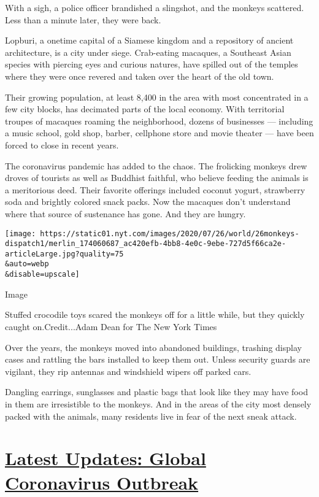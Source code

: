 With a sigh, a police officer brandished a slingshot, and the monkeys
scattered. Less than a minute later, they were back.

Lopburi, a onetime capital of a Siamese kingdom and a repository of
ancient architecture, is a city under siege. Crab-eating macaques, a
Southeast Asian species with piercing eyes and curious natures, have
spilled out of the temples where they were once revered and taken over
the heart of the old town.

Their growing population, at least 8,400 in the area with most
concentrated in a few city blocks, has decimated parts of the local
economy. With territorial troupes of macaques roaming the neighborhood,
dozens of businesses --- including a music school, gold shop, barber,
cellphone store and movie theater --- have been forced to close in
recent years.

The coronavirus pandemic has added to the chaos. The frolicking monkeys
drew droves of tourists as well as Buddhist faithful, who believe
feeding the animals is a meritorious deed. Their favorite offerings
included coconut yogurt, strawberry soda and brightly colored snack
packs. Now the macaques don't understand where that source of sustenance
has gone. And they are hungry.

\texttt{[image: https://static01.nyt.com/images/2020/07/26/world/26monkeys-dispatch1/merlin\_174060687\_ac420efb-4bb8-4e0c-9ebe-727d5f66ca2e-articleLarge.jpg?quality=75\\\&auto=webp\\\&disable=upscale]}

Image

Stuffed crocodile toys scared the monkeys off for a little while, but
they quickly caught on.Credit...Adam Dean for The New York Times

Over the years, the monkeys moved into abandoned buildings, trashing
display cases and rattling the bars installed to keep them out. Unless
security guards are vigilant, they rip antennas and windshield wipers
off parked cars.

Dangling earrings, sunglasses and plastic bags that look like they may
have food in them are irresistible to the monkeys. And in the areas of
the city most densely packed with the animals, many residents live in
fear of the next sneak attack.

\hypertarget{latest-updates-global-coronavirus-outbreak}{%
\section{\texorpdfstring{\href{https://www.nytimes.com/2020/08/01/world/coronavirus-covid-19.html?action=click\&pgtype=Article\&state=default\&region=MAIN_CONTENT_1\&context=storylines_live_updates}{Latest
Updates: Global Coronavirus
Outbreak}}{Latest Updates: Global Coronavirus Outbreak}}\label{latest-updates-global-coronavirus-outbreak}}

